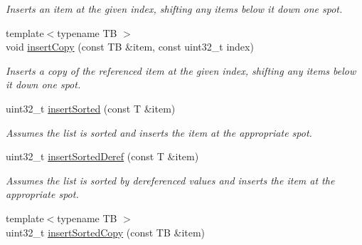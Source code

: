 \begin{DoxyCompactItemize}
\begin{DoxyCompactList}\small\item\em \-Inserts an item at the given index, shifting any items below it down one spot. \end{DoxyCompactList}\item 
\hypertarget{classxsens_1_1List_a7091d2b5b42fa9a6c29d6500d7f18ae4}{{\footnotesize template$<$typename T\-B $>$ }\\void \hyperlink{classxsens_1_1List_a7091d2b5b42fa9a6c29d6500d7f18ae4}{insert\-Copy} (const \-T\-B \&item, const uint32\-\_\-t index)}\label{classxsens_1_1List_a7091d2b5b42fa9a6c29d6500d7f18ae4}

\begin{DoxyCompactList}\small\item\em \-Inserts a copy of the referenced item at the given index, shifting any items below it down one spot. \end{DoxyCompactList}\item 
\hypertarget{classxsens_1_1List_ad2faf69758a9b440bd3fdbaf74c8f79a}{uint32\-\_\-t \hyperlink{classxsens_1_1List_ad2faf69758a9b440bd3fdbaf74c8f79a}{insert\-Sorted} (const \-T \&item)}\label{classxsens_1_1List_ad2faf69758a9b440bd3fdbaf74c8f79a}

\begin{DoxyCompactList}\small\item\em \-Assumes the list is sorted and inserts the item at the appropriate spot. \end{DoxyCompactList}\item 
\hypertarget{classxsens_1_1List_a0dd27178ee897695a5c56668fc0b56fd}{uint32\-\_\-t \hyperlink{classxsens_1_1List_a0dd27178ee897695a5c56668fc0b56fd}{insert\-Sorted\-Deref} (const \-T \&item)}\label{classxsens_1_1List_a0dd27178ee897695a5c56668fc0b56fd}

\begin{DoxyCompactList}\small\item\em \-Assumes the list is sorted by dereferenced values and inserts the item at the appropriate spot. \end{DoxyCompactList}\item 
\hypertarget{classxsens_1_1List_aab22e10c721ed7db6bd176572a5aaf08}{{\footnotesize template$<$typename T\-B $>$ }\\uint32\-\_\-t \hyperlink{classxsens_1_1List_aab22e10c721ed7db6bd176572a5aaf08}{insert\-Sorted\-Copy} (const \-T\-B \&item)}\label{classxsens_1_1List_aab22e10c721ed7db6bd176572a5aaf08}


\end{DoxyCompactItemize}
